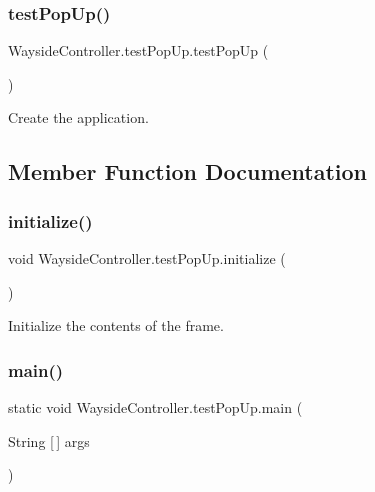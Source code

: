\subsubsection{\texorpdfstring{test\+Pop\+Up()}{testPopUp()}}
{\footnotesize\ttfamily Wayside\+Controller.\+test\+Pop\+Up.\+test\+Pop\+Up (\begin{DoxyParamCaption}{ }\end{DoxyParamCaption})}



Create the application. 



\subsection{Member Function Documentation}
\mbox{\label{classWaysideController_1_1testPopUp_a70581bc9a4295357f7a7ad313c6a0568}} 
\subsubsection{\texorpdfstring{initialize()}{initialize()}}
{\footnotesize\ttfamily void Wayside\+Controller.\+test\+Pop\+Up.\+initialize (\begin{DoxyParamCaption}{ }\end{DoxyParamCaption})\hspace{0.3cm}{\ttfamily [private]}}



Initialize the contents of the frame. 

\mbox{\label{classWaysideController_1_1testPopUp_ac54f2c2c1dbe5aa8a76375e714641124}} 
\subsubsection{\texorpdfstring{main()}{main()}}
{\footnotesize\ttfamily static void Wayside\+Controller.\+test\+Pop\+Up.\+main (\begin{DoxyParamCaption}\item[{String \mbox{[}$\,$\mbox{]}}]{args }\end{DoxyParamCaption})\hspace{0.3cm}{\ttfamily [static]}}



